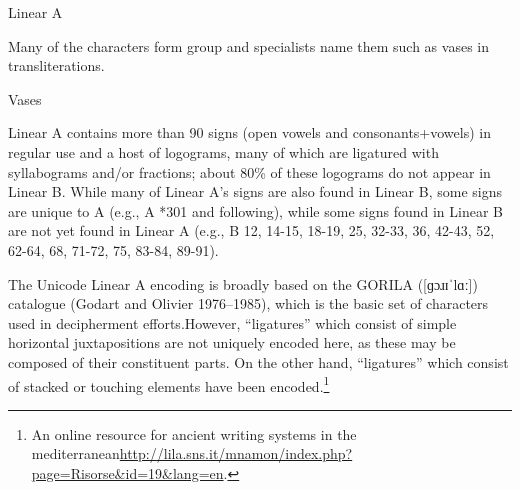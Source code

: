 \begin{scriptexample}[]{Linear A}
\end{scriptexample}

Many of the characters form group and specialists name them such as vases in transliterations.

\begin{scriptexample}[]{Vases}
\begin{center}
\end{center}
\end{scriptexample}

Linear A contains more than 90 signs (open vowels and consonants+vowels) in regular use and a host of
logograms, many of which are ligatured with syllabograms and/or fractions; about 80\% of these
logograms do not appear in Linear B. While many of Linear A’s signs are also found in Linear B, some
signs are unique to A (e.g., A *301 and following), while some signs found in Linear B are not yet found
in Linear A (e.g., B 12, 14-15, 18-19, 25, 32-33, 36, 42-43, 52, 62-64, 68, 71-72, 75, 83-84, 89-91).

The Unicode Linear A encoding is broadly based on the GORILA ([{\arial ɡɔɹɪˈlɑː}]) catalogue
(Godart and Olivier 1976–1985)\parencite{gorila}, which is the basic set of characters used in decipherment efforts.However, “ligatures” which consist of simple horizontal juxtapositions are not uniquely encoded here, as
these may be composed of their constituent parts. On the other hand, “ligatures” which consist of stacked
or touching elements have been encoded.\footnote{An online resource for ancient writing systems in the mediterranean\protect\url{http://lila.sns.it/mnamon/index.php?page=Risorse&id=19&lang=en}. } 






